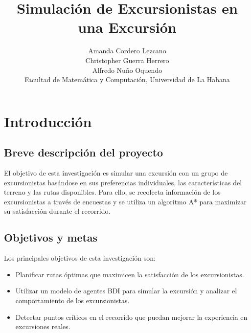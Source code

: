 \documentclass[10pt,twocolumn]{article}
\begin{document}
	\title{Simulación de Excursionistas en una Excursión}
	\author{
		Amanda Cordero Lezcano\\
		Christopher Guerra Herrero\\
		Alfredo Nuño Oquendo\\Facultad de Matemática y Computación, Universidad de La Habana
	}
	
	
	\section{Introducción}
	
	\subsection{Breve descripción del proyecto}
	El objetivo de esta investigación es simular una excursión con un grupo de excursionistas basándose en sus preferencias individuales, las características del terreno y las rutas disponibles. Para ello, se recolecta información de los excursionistas a través de encuestas y se utiliza un algoritmo A* para maximizar su satisfacción durante el recorrido.
	
	\subsection{Objetivos y metas}
	Los principales objetivos de esta investigación son:
	\begin{itemize}
		\item Planificar rutas óptimas que maximicen la satisfacción de los excursionistas.
		\item Utilizar un modelo de agentes BDI para simular la excursión y analizar el comportamiento de los excursionistas.
		\item Detectar puntos críticos en el recorrido que puedan mejorar la experiencia en excursiones reales.
	\end{itemize}
	
\end{document}
